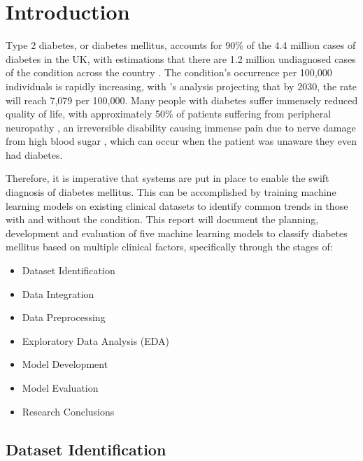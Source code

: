 \documentclass[12pt]{report}
\newcommand{\para}{\vspace{8pt}\noindent}
\begin{document}
\chapter{Introduction}

Type 2 diabetes, or diabetes mellitus, accounts for 90\% of the 4.4 million cases of diabetes in the UK, with estimations that 
there are 1.2 million undiagnosed cases of the condition across the country \autocite{diabetes_uk_how_nodate}. The condition's 
occurrence per 100,000 individuals is rapidly increasing, with \textcite{khan_epidemiology_2020}'s analysis projecting that by 
2030, the rate will reach 7,079 per 100,000. Many people with diabetes suffer immensely reduced quality of life, with approximately 50\% 
of patients suffering from peripheral neuropathy \autocite{dhanapalaratnam_effect_2024}, an irreversible disability causing immense pain due 
to nerve damage from high blood sugar \autocite{nhs_peripheral_2022}, which can occur when the patient was unaware they even 
had diabetes. 

\para
Therefore, it is imperative that systems are put in place to enable the swift diagnosis of diabetes mellitus. 
This can be accomplished by training machine learning models on existing clinical datasets 
to identify common trends in those with and without the condition. This report will document the planning, development 
and evaluation of five machine learning models to classify diabetes mellitus based on multiple clinical factors, specifically through the stages of:

\begin{itemize}
    \item Dataset Identification
    \item Data Integration
    \item Data Preprocessing
    \item Exploratory Data Analysis (EDA)
    \item Model Development 
    \item Model Evaluation
    \item Research Conclusions
\end{itemize}

\pagebreak 
\section{Dataset Identification}
\end{document}
